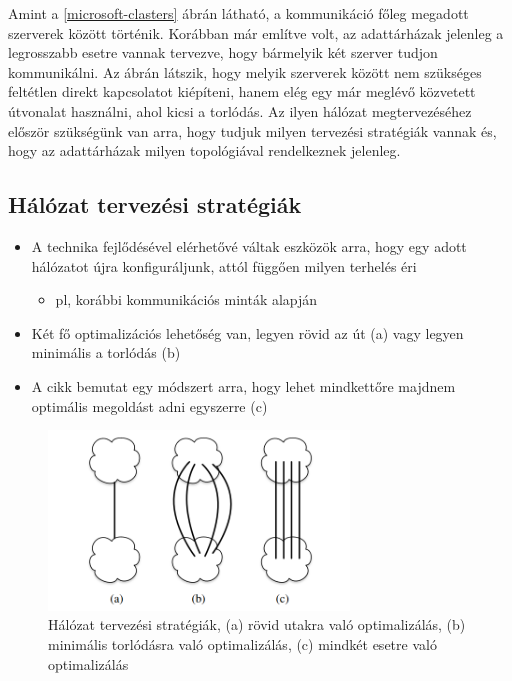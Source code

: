 \documentclass[12pt]{report}
\begin{document}
Amint a \ref{microsoft-clasters} ábrán látható, a kommunikáció főleg megadott szerverek között történik.
Korábban már említve volt, az adattárházak jelenleg a legrosszabb esetre vannak tervezve, hogy bármelyik két szerver tudjon kommunikálni.
Az ábrán látszik, hogy melyik szerverek között nem szükséges feltétlen direkt kapcsolatot kiépíteni, hanem elég egy már meglévő közvetett útvonalat használni, ahol kicsi a torlódás.
Az ilyen hálózat megtervezéséhez először szükségünk van arra, hogy tudjuk milyen tervezési stratégiák vannak és, hogy az adattárházak milyen topológiával rendelkeznek jelenleg.

\subsection{Hálózat tervezési stratégiák}

\begin{itemize}
	\item A technika fejlődésével elérhetővé váltak eszközök arra, hogy egy adott hálózatot újra konfiguráljunk, attól függően milyen terhelés éri
	\begin{itemize}
		\item pl, korábbi kommunikációs minták alapján
	\end{itemize}
	\item Két fő optimalizációs lehetőség van, legyen rövid az út (a) vagy legyen minimális a torlódás (b)
	\item A cikk bemutat egy módszert arra, hogy lehet mindkettőre majdnem optimális megoldást adni egyszerre (c)
\end{itemize}

\begin{figure}[h]
	\centering
	\includegraphics[width=8cm]{pictures/optimalshemes.png}
	\caption{Hálózat tervezési stratégiák, (a) rövid utakra való optimalizálás, (b) minimális torlódásra való optimalizálás, (c) mindkét esetre való optimalizálás}
	\label{network-strategies}
\end{figure}
\end{document}
